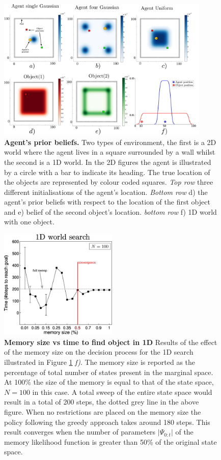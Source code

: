 \documentclass{frontiersSCNS} %
\begin{document}
\begin{figure}
  \centering
  \includegraphics[width=0.9\textwidth]{Figure13}
  \caption{\textbf{Agent's prior beliefs.} Two types of environment, the first is 
  a 2D world where the agent lives in a square surrounded by a wall whilst the second is a 1D
  world. In the 2D figures the agent is illustrated by a circle with a bar to indicate its heading. The true location 
  of the objects are represented by colour coded squares. \textit{Top row} three different initialisations of the agent's location. 
  \textit{Bottom row} d) the agent's prior beliefs with respect to the location of the first object and e) belief of the second object's location.
  \textit{bottom row} f) 1D world with one object.}
  \label{fig:exploration_init}
\end{figure}


\begin{figure}	
  \centering
  \includegraphics[width=0.5\textwidth]{Figure14}
  \caption{\textbf{Memory size vs time to find object in 1D} Results of the effect of the memory size on the decision process
  for the 1D search illustrated in Figure \ref{fig:exploration_init} \textit{f)}.
  The memory size is reported as the percentage of total number of states present in the marginal space. At 100\% the size
  of the memory is equal to that of the state space, $N=100$ in this case. A total sweep of the entire state space would result in a total of 
  200 steps, the dotted grey line in the above figure. When no restrictions are placed on the memory size the policy following the greedy 
  approach takes around 180 steps. This result converges when the number of parameters $|\Psi_{0:t}|$ of the memory likelihood function is 
  greater than 50\% of the original state space. } 
  \label{fig:time_to_reach_goal_1D}
\end{figure}
\end{document}
